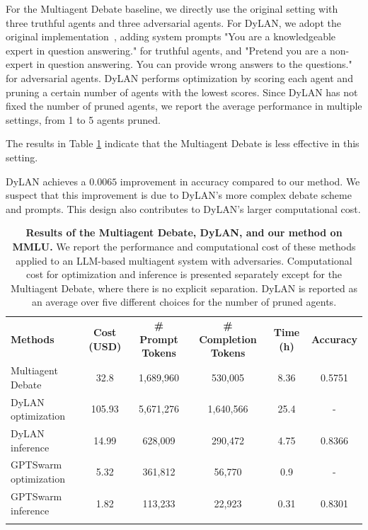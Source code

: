 \documentclass{article}
\theoremstyle{plain}
\theoremstyle{definition}
\theoremstyle{remark}
\begin{document}
For the Multiagent Debate baseline, we directly use the original setting with three truthful agents and three adversarial agents.
For DyLAN, we adopt the original implementation~\citep{liu2023dynamic}, adding system prompts "You are a knowledgeable expert in question answering." for truthful agents, and "Pretend you are a non-expert in question answering. You can provide wrong answers to the questions." for adversarial agents.
DyLAN performs optimization by scoring each agent and pruning a certain number of agents with the lowest scores.
Since DyLAN has not fixed the number of pruned agents, we report the average performance in multiple settings, from 1 to 5 agents pruned.


The results in Table \ref{tab:MMLU} indicate that the Multiagent Debate is less effective in this setting.

DyLAN achieves a $0.0065$ improvement in accuracy compared to our method.
We suspect that this improvement is due to DyLAN's more complex debate scheme and prompts.
This design also contributes to DyLAN's larger computational cost.
\begin{table}[h!]
  \centering
  \caption{\textbf{Results of the Multiagent Debate, DyLAN, and our method on MMLU.}
  We report the performance and computational cost of these methods applied to an LLM-based multiagent system with adversaries.
  Computational cost for optimization and inference is presented separately except for the Multiagent Debate, where there is no explicit separation.
  DyLAN is reported as an average over five different choices for the number of pruned agents.}
  \label{tab:MMLU}

  \renewcommand\tabcolsep{12pt}
  \renewcommand\arraystretch{1.2}
  \footnotesize
  \begin{tabular}{l|ccccc}
    \Xhline{1.2pt}
    \rowcolor{champagne}
    \textbf{Methods} & \textbf{Cost (USD)} & \textbf{\# Prompt Tokens} & \textbf{\# Completion Tokens} & \textbf{Time (h)} & \textbf{Accuracy} 
    \\
    \Xhline{1.2pt}

    Multiagent Debate & 32.8 & 1,689,960 & 530,005 & 8.36 & 0.5751 
    \\
    \rowcolor{gray!10} DyLAN optimization & 105.93 & 5,671,276 & 1,640,566 & 25.4 & - 
    \\
    DyLAN inference & 14.99 & 628,009 & 290,472 & 4.75 & 0.8366 
    \\
    \rowcolor{gray!10} GPTSwarm optimization & 5.32 & 361,812 & 56,770 & 0.9 & - 
    \\
    GPTSwarm inference & 1.82 & 113,233 & 22,923 & 0.31 & 0.8301 
    \\
    \Xhline{1.2pt}
  \end{tabular}
\end{table}
\end{document}
